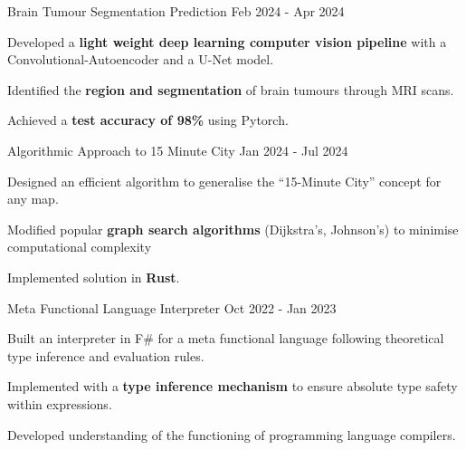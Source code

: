 

\begin{cvprojectentries}

  \cvprojectentry
    {Brain Tumour Segmentation Prediction} %
    {Feb 2024 - Apr 2024} %
    {
        \begin{cvitems} %
            \item {Developed a \textbf{light weight deep learning computer vision pipeline} with a Convolutional-Autoencoder and a U-Net model.}
            \item {Identified the \textbf{region and segmentation} of brain tumours through MRI scans.}
            \item {Achieved a \textbf{test accuracy of 98\%} using Pytorch.}
        \end{cvitems}
    }

  \cvprojectentry
    {Algorithmic Approach to 15 Minute City} %
    {Jan 2024 - Jul 2024} %
    {
      \begin{cvitems} %
        \item {Designed an efficient algorithm to generalise the ``15-Minute City'' concept for any map.}
        \item {Modified popular \textbf{graph search algorithms} (Dijkstra's, Johnson's) to minimise computational complexity}
        \item {Implemented solution in \textbf{Rust}.}
      \end{cvitems}
    }

  \cvprojectentry
    {Meta Functional Language Interpreter} %
    {Oct 2022 - Jan 2023} %
    {
        \begin{cvitems} %
            \item {Built an interpreter in F\# for a meta functional language following theoretical type inference and evaluation rules.}
            \item {Implemented with a \textbf{type inference mechanism} to ensure absolute type safety within expressions.}
            \item {Developed understanding of the functioning of programming language compilers.}
        \end{cvitems}
    }


\end{cvprojectentries}
